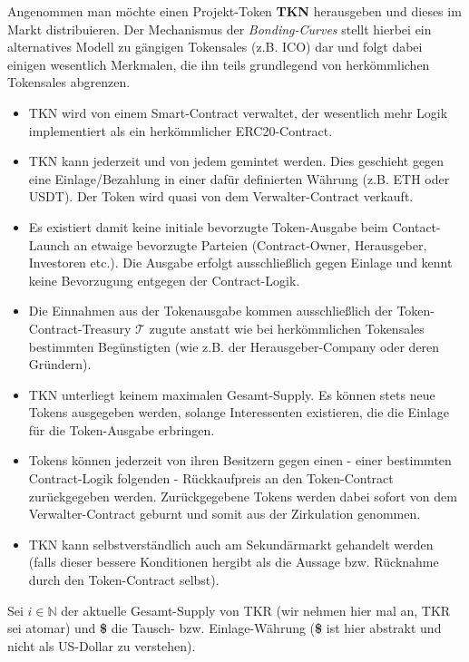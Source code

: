 \begin{Def}
\label{defBC}

Angenommen man möchte einen Projekt-Token \textbf{TKN} herausgeben und dieses im Markt distribuieren. Der Mechanismus der \textit{Bonding-Curves} stellt hierbei ein alternatives Modell zu gängigen Tokensales (z.B. ICO) dar und folgt dabei einigen wesentlich Merkmalen, die ihn teils grundlegend von herkömmlichen Tokensales abgrenzen.

\begin{itemize}
  \item TKN wird von einem Smart-Contract verwaltet, der wesentlich mehr Logik implementiert als ein herkömmlicher ERC20-Contract.
  \item TKN kann jederzeit und von jedem gemintet werden. Dies geschieht gegen eine Einlage/Bezahlung in einer dafür definierten Währung (z.B. ETH oder USDT). Der Token wird quasi von dem Verwalter-Contract verkauft.
  \item Es existiert damit keine initiale bevorzugte Token-Ausgabe beim Contact-Launch an etwaige bevorzugte Parteien (Contract-Owner, Herausgeber, Investoren etc.). Die Ausgabe erfolgt ausschließlich gegen Einlage und kennt keine Bevorzugung entgegen der Contract-Logik. 
  \item Die Einnahmen aus der Tokenausgabe kommen ausschließlich der Token-Cont\-ract-Treasury $\mathbf{\mathcal{T}}$ zugute anstatt wie bei herkömmlichen Tokensales bestimmten Begünstigten (wie z.B. der Herausgeber-Company oder deren Gründern).
  \item TKN unterliegt keinem maximalen Gesamt-Supply. Es können stets neue Tokens ausgegeben werden, solange Interessenten existieren, die die Einlage für die Token-Ausgabe erbringen.
  \item Tokens können jederzeit von ihren Besitzern gegen einen - einer bestimmten Contract-Logik folgenden - Rückkaufpreis an den Token-Contract zurückgegeben werden. Zurückgegebene Tokens werden dabei sofort von dem Verwalter-Contract geburnt und somit aus der Zirkulation genommen.
  \item TKN kann selbstverständlich auch am Sekundärmarkt gehandelt werden (falls dieser bessere Konditionen hergibt als die Aussage bzw. Rücknahme durch den Token-Contract selbst).
\end{itemize}

\vspace{0.2cm}

Sei $i \in \mathbb{N}$ der aktuelle Gesamt-Supply von TKR (wir nehmen hier mal an, TKR sei atomar) und \textbf{\$} die Tausch- bzw. Einlage-Währung (\textbf{\$} ist hier abstrakt und nicht als US-Dollar zu verstehen).


\end{Def}
